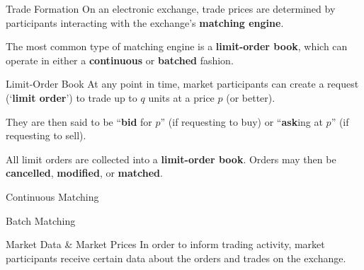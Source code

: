 \documentclass{beamer}
\begin{document}
\begin{frame}{Trade Formation}
	On an electronic exchange, trade prices are determined by participants interacting with the exchange's \textbf{matching engine}.%

	The most common type of matching engine is a \textbf{limit-order book}, which can operate in either a \textbf{continuous} or \textbf{batched} fashion.

	\pause
	
	\begin{block}{Limit-Order Book} %
		At any point in time, market participants can create a request (`\textbf{limit order}') to trade up to $q$ units at a price $p$ (or better). %
		
		They are then said to be ``\textbf{bid} for $p$'' (if requesting to buy) or ``\textbf{ask}ing at $p$'' (if requesting to sell). %

		All limit orders are collected into a \textbf{limit-order book}. Orders may then be \textbf{cancelled}, \textbf{modified}, or \textbf{matched}. %



	\end{block}
	\begin{block}{Continuous Matching}
	\end{block} %

	\begin{block}{Batch Matching}
		
	\end{block} %
\end{frame}

\begin{frame}{Market Data \& Market Prices}
	In order to inform trading activity, market participants receive certain data about the orders and trades on the exchange.




\end{frame}
\end{document}
